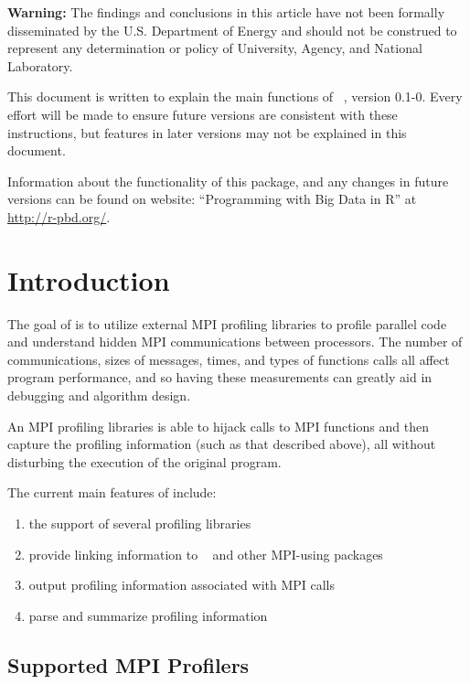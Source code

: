 {\color{red} \bf Warning:}
The findings and conclusions in this article have not been
formally disseminated by the U.S. Department of Energy
and should not be construed to represent any determination or
policy of University, Agency, and National Laboratory.

This document is written to explain the main
functions of ~\citep{Chen2013pbdPROFpackage}, version 0.1-0.
Every effort will be made to ensure future versions are consistent with
these instructions, but features in later versions may not be explained
in this document.

Information about the functionality of this package,
and any changes in future versions can be found on website:
``Programming with Big Data in R'' at
\url{http://r-pbd.org/}.



\section{Introduction}
\label{sec:introduction}

The goal of  is to utilize external MPI profiling libraries
to profile parallel  code and understand hidden MPI
communications between processors. The number of communications,
sizes of messages, times, and types of functions calls all affect program
performance, and so having these measurements can greatly aid in debugging and 
algorithm design. 

An MPI profiling libraries is able to
hijack calls to MPI functions and then capture the profiling information 
(such as that described above), all without disturbing the execution of the original program.

The current main features of  include:
\begin{enumerate}
\item the support of several profiling libraries
\item provide linking information to ~\citep{pbdR2012} and other MPI-using  packages
\item output profiling information associated with MPI calls
\item parse and summarize profiling information
\end{enumerate}



\subsection{Supported MPI Profilers}

